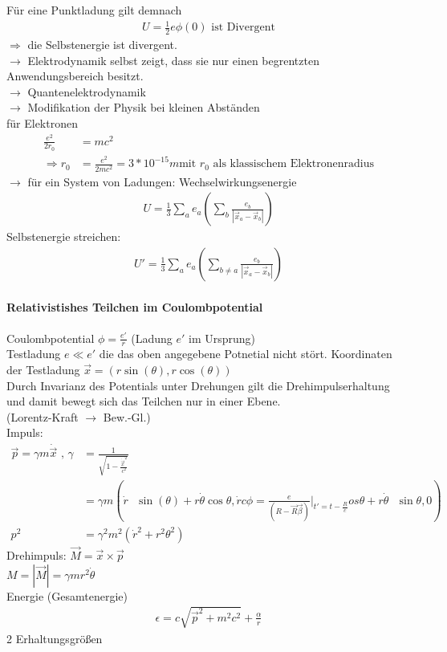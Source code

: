 \documentclass[a4paper]{article}
\begin{document}
Für eine Punktladung gilt demnach
\begin{align}
U=\frac{1}{2}e\phi(0) \text{ ist Divergent}
\end{align}
$\Rightarrow$ die Selbstenergie ist divergent.\\
$\rightarrow$ Elektrodynamik selbst zeigt, dass sie nur einen begrentzten
Anwendungsbereich besitzt.\\
$\rightarrow$ Quantenelektrodynamik\\
$\rightarrow$ Modifikation der Physik bei kleinen Abständen\\
für Elektronen\\
\begin{align}
\frac{e^2}{2r_0}&=mc^2 \\
\Rightarrow r_0&=\frac{e^2}{2mc^2}=3*10^{-15}m \text{
mit }r_0\text{ als klassischem Elektronenradius}
\end{align}
$\rightarrow$ für ein System von Ladungen: Wechselwirkungsenergie
\begin{align}
U=\frac{1}{3}\sum_a e_a \left(\sum_{b} \frac{e_b}{|\vec{x}_a-\vec{x}_b|} \right)
\end{align}
Selbstenergie streichen:
\begin{align}
U'=\frac{1}{3}\sum_a e_a \left(\sum_{b\neq a} \frac{e_b}{|\vec{x}_a-\vec{x}_b|}
\right)
\end{align}
\paragraph{Relativistishes Teilchen im Coulombpotential}
Coulombpotential $\phi=\frac{e'}{r}$ (Ladung $e'$ im Ursprung)\\
Testladung $e \ll e'$ die das oben angegebene Potnetial nicht stört.
Koordinaten der Testladung $\vec{x}=(r \sin(\theta), r \cos(\theta))$\\
Durch Invarianz des Potentials unter Drehungen gilt die Drehimpulserhaltung
und damit bewegt sich das Teilchen nur in einer Ebene.\\
(Lorentz-Kraft $\rightarrow$ Bew.-Gl.)\\
Impuls: 
\begin{align}
\vec{p}=\gamma m \dot{\vec{x}} \text{ , }
\gamma&=\frac{1}{\sqrt{1-\frac{\dot{\vec{x}}^2}{c^2}}}\\
&=\gamma m \left(\dot{r}\text{ }\sin(\theta)+r \dot{\theta} \text{
}\cos\theta,\dot{r} \text{
}c\phi=\frac{e}{(R-\vec{R}\vec{\beta})}|_{t'=t-\frac{R}{c}}os\theta+r\dot{\theta} \text{ }\sin\theta,0\right)\\
p^2&=\gamma^2m^2(\dot{r}^2+r^2 \theta^2)
\end{align}
Drehimpuls: $\vec{M}=\vec{x}\times\vec{p}$\\
$M=|\vec{M}|=\gamma mr^2\dot{\theta}$\\
Energie (Gesamtenergie)
\begin{align}
\epsilon=c\sqrt{\vec{p}^2+m^2c^2}+\frac{\alpha}{r}
\end{align}
2 Erhaltungsgrößen
\end{document}
